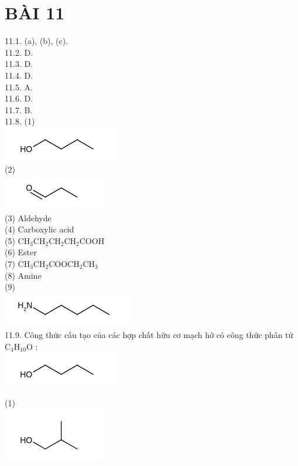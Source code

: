 \documentclass[10pt]{article}
\begin{document}
\section*{BÀI 11}
11.1. (a), (b), (c).\\
11.2. D.\\
11.3. D.\\
11.4. D.\\
11.5. A.\\
11.6. D.\\
11.7. B.\\
11.8. (1)\\
\includegraphics{smile-634b41a8e9c8b7bbba6ce3b1a8249d37b08577fa}\\
(2)\\
\includegraphics{smile-7df88a4bf8f88a43e1a13b7bcdfe93efbd0ab1f3}\\
(3) Aldehyde\\
(4) Carboxylic acid\\
(5) $\mathrm{CH}_{3} \mathrm{CH}_{2} \mathrm{CH}_{2} \mathrm{CH}_{2} \mathrm{COOH}$\\
(6) Ester\\
(7) $\mathrm{CH}_{3} \mathrm{CH}_{2} \mathrm{COOCH}_{2} \mathrm{CH}_{3}$\\
(8) Amine\\
(9)\\
\includegraphics{smile-c1a62ec44c889f8991c4e8c00571ff3daf1c69a4}\\
11.9. Công thức cấu tạo của các hợp chất hữu cơ mạch hở có công thức phân tử $\mathrm{C}_{4} \mathrm{H}_{10} \mathrm{O}$ :\\
\includegraphics{smile-541c616d82f5fb3b6bc90a790b58ed3002fbd535}

(1)\\
\includegraphics{smile-3aa3bf4fea8667f612d2cd71ff3329655532f031}
\end{document}
